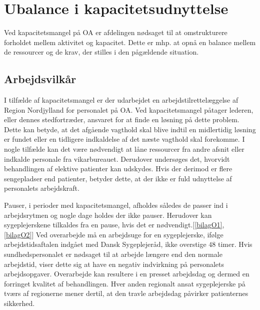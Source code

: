 \section{Ubalance i kapacitetsudnyttelse}
Ved kapacitetsmangel på OA er afdelingen nødsaget til at omstrukturere forholdet mellem aktivitet og kapacitet. Dette er mhp. at opnå en balance mellem de ressourcer og de krav, der stilles i den pågældende situation.\cite{Bjerg2016} %

\subsection{Arbejdsvilkår} \label{Per_sik}

I tilfælde af kapacitetsmangel er der udarbejdet en arbejdstilrettelæggelse af Region Nordjylland for personalet på OA. Ved kapacitetsmangel påtager lederen, eller dennes stedfortræder, ansvaret for at finde en løsning på dette problem. Dette kan betyde, at det afgående vagthold skal blive indtil en midlertidig løsning er fundet eller en tidligere indkaldelse af det næste vagthold skal forekomme. I nogle tilfælde kan det være nødvendigt at låne ressourcer fra andre afsnit eller indkalde personale fra vikarbureauet. Derudover undersøges det, hvorvidt behandlingen af elektive patienter kan udskydes.\cite{Bjerg2016} 
Hvis der derimod er flere sengepladser end patienter, betyder dette, at der ikke er fuld udnyttelse af personalets arbejdskraft.

Pauser, i perioder med kapacitetsmangel, afholdes således de passer ind i arbejdsrytmen og nogle dage holdes der ikke pauser. Herudover kan sygeplejerskene tilkaldes fra en pause, hvis det er nødvendigt.[\ref{bilagO1}, \ref{bilagO2}] Ved overarbejde må en arbejdsuge for en sygeplejerske, ifølge arbejdstidsaftalen indgået med Dansk Sygeplejeråd, ikke overstige $48$ timer. Hvis sundhedspersonalet er nødsaget til at arbejde længere end den normale arbejdstid, viser dette sig at have en negativ indvirkning på personalets arbejdsopgaver\cite{Dinges2004}. Overarbejde kan resultere i en presset arbejdsdag og dermed en forringet kvalitet af behandlingen. Hver anden regionalt ansat sygeplejerske på tværs af regionerne mener dertil, at den travle arbejdsdag påvirker patienternes sikkerhed.\cite{Kjeldsen2015}



